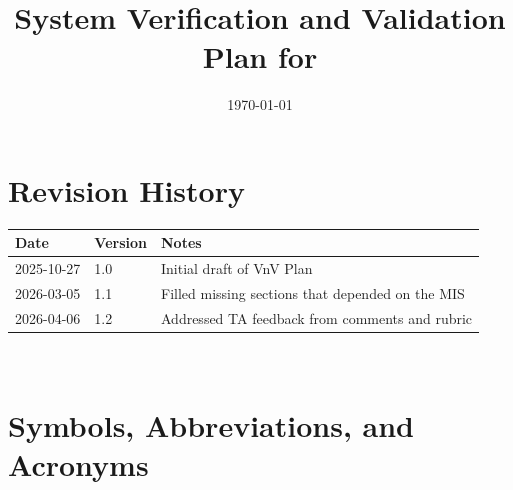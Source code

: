 \documentclass[12pt, titlepage]{article}
\begin{document}
\title{System Verification and Validation Plan for \progname{}} 
\author{\authname}
\date{\today}
	
\maketitle


\section*{Revision History}

\begin{tabularx}{\textwidth}{p{3cm}p{2cm}X}
\toprule {\bf Date} & {\bf Version} & {\bf Notes}\\
\midrule
2025-10-27 & 1.0 & Initial draft of VnV Plan\\
2026-03-05 & 1.1 & Filled missing sections that depended on the MIS\\
2026-04-06 & 1.2 & Addressed TA feedback from comments and rubric\\
\bottomrule
\end{tabularx}

~\\

\newpage

\tableofcontents

\listoftables


\newpage

\section{Symbols, Abbreviations, and Acronyms}
\end{document}
